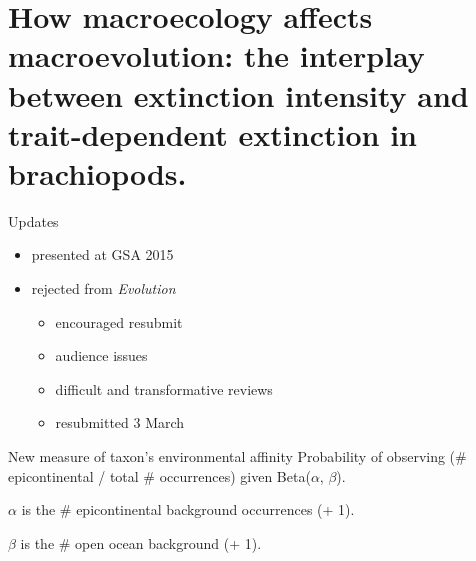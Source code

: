 \documentclass{beamer}
\title{}
\author{}
\institute{}
\date{}
\begin{document}
\begin{frame}
  \tableofcontents
\end{frame}


\section{How macroecology affects macroevolution: the interplay between extinction intensity and trait-dependent extinction in brachiopods.}

\begin{frame}
  \begin{block}{Updates}
    \begin{itemize}
      \item presented at GSA 2015
      \item rejected from \textit{Evolution}
        \begin{itemize}
          \item encouraged resubmit
          \item audience issues
          \item difficult and transformative reviews
          \item resubmitted 3 March
        \end{itemize}
    \end{itemize}
  \end{block}
\end{frame}

\begin{frame}
  \begin{block}{New measure of taxon's environmental affinity}
    Probability of observing (\# epicontinental / total \# occurrences) given Beta(\(\alpha\), \(\beta\)).

    \(\alpha\) is the \# epicontinental background occurrences (+ 1).

    \(\beta\) is the \# open ocean background (+ 1).
  \end{block}
\end{frame}
\end{document}
